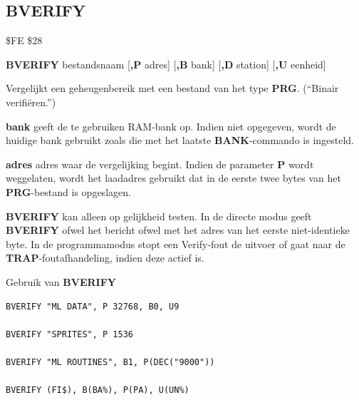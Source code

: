 \subsection{BVERIFY}
\begin{description}[leftmargin=2cm,style=nextline]
\item [Token:]    \$FE \$28

\item [Formaat:]   {\bf BVERIFY} bestandsnaam [{\bf,P} adres] [{\bf,B} bank] [{\bf,D} station] [{\bf,U} eenheid]

\item [Gebruik:]    Vergelijkt een geheugenbereik met een bestand van het type {\bf PRG}. (``Binair verifiëren.'')

                  \filenamedefinition

                  {\bf bank} geeft de te gebruiken RAM-bank op. Indien niet opgegeven, wordt de huidige bank gebruikt zoals die met het laatste {\bf BANK}-commando is ingesteld.

                  {\bf adres} adres waar de vergelijking begint. Indien de parameter {\bf P} wordt weggelaten, wordt het laadadres gebruikt dat in de eerste twee bytes van het {\bf PRG}-bestand is opgeslagen.

                  \drivedefinition

                  \unitdefinition

\item [Opmerkingen:]  {\bf BVERIFY} kan alleen op gelijkheid testen. In de directe modus geeft {\bf BVERIFY} ofwel het bericht  ofwel  met het adres van het eerste niet-identieke byte. In de programmamodus stopt een Verify-fout de uitvoer of gaat naar de {\bf TRAP}-foutafhandeling, indien deze actief is.

\item [Voorbeelden:] Gebruik van {\bf BVERIFY}

\begin{tcolorbox}[colback=black,coltext=white]
\verbatimfont{\codefont}
\begin{verbatim}
BVERIFY "ML DATA", P 32768, B0, U9

BVERIFY "SPRITES", P 1536

BVERIFY "ML ROUTINES", B1, P(DEC("9000"))

BVERIFY (FI$), B(BA%), P(PA), U(UN%)
\end{verbatim}
\end{tcolorbox}
\end{description}

